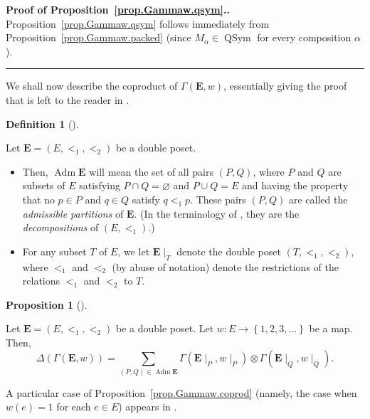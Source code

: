 \documentclass[numbers=enddot,12pt,final,onecolumn,notitlepage,abstracton]{scrartcl}
\theoremstyle{definition}
\newtheorem{prop}[theo]{Proposition}
\newenvironment{proposition}[1][]
{\begin{prop}[#1]\begin{leftbar}}
{\end{leftbar}\end{prop}}
\newtheorem{defi}[theo]{Definition}
\newenvironment{definition}[1][]
{\begin{defi}[#1]\begin{leftbar}}
{\end{leftbar}\end{defi}}
\newenvironment{proof}[1][Proof]{\noindent\textbf{#1.} }{\ \rule{0.5em}{0.5em}}
\let\sumnonlimits\sum
\renewcommand{\sum}{\sumnonlimits\limits}
\newcommand{\Adm}{\operatorname{Adm}}
\newcommand{\QSym}{{\operatorname{QSym}}}
\newcommand{\EE}{{\mathbf{E}}}
\begin{document}
\begin{proof}[Proof of Proposition~\ref{prop.Gammaw.qsym}.]
Proposition~\ref{prop.Gammaw.qsym} follows immediately from
Proposition~\ref{prop.Gammaw.packed}
(since $M_\alpha \in \QSym$ for every composition $\alpha$).
\end{proof}

We shall now describe the coproduct of $\Gamma\left(\EE, w\right)$,
essentially giving the proof that is left to the reader in
\cite[Theorem 2.2]{Mal-Reu-DP}.

\begin{definition}
Let $\EE = \left(E, <_1, <_2\right)$ be a double poset.

\begin{itemize}

\item[(a)]
Then, $\Adm \EE$ will mean the set of all pairs
$\left(P, Q\right)$, where $P$ and $Q$ are subsets of $E$ satisfying
$P \cap Q = \varnothing$ and $P \cup Q = E$ and having the property
that no $p \in P$ and $q \in Q$ satisfy $q <_1 p$. These pairs
$\left(P, Q\right)$ are
called the \textit{admissible partitions} of $\EE$. (In the
terminology of \cite{Mal-Reu-DP}, they are the
\textit{decompositions} of $\left(E, <_1\right)$.)

\item[(b)] For
any subset $T$ of $E$, we let $\EE\mid_T$ denote the double poset
$\left(T, <_1, <_2\right)$, where $<_1$ and $<_2$ (by abuse of
notation) denote the restrictions of the relations $<_1$ and $<_2$
to $T$.

\end{itemize}
\end{definition}

\begin{proposition}
\label{prop.Gammaw.coprod}
Let $\EE = \left(E, <_1, <_2\right)$ be a double poset. Let
$w : E \to \left\{1, 2, 3, \ldots\right\}$ be a map.
Then,
\begin{equation}
\label{eq.prop.Gammaw.coprod}
\Delta\left(\Gamma\left(\EE, w\right)\right)
= \sum_{\left(P, Q\right) \in \Adm \EE}
\Gamma\left(\EE\mid_P, w\mid_P\right)
\otimes \Gamma\left(\EE\mid_Q, w\mid_Q\right) .
\end{equation}
\end{proposition}

A particular case of Proposition~\ref{prop.Gammaw.coprod} (namely,
the case when $w\left(e\right) = 1$ for each $e \in E$) appears in
\cite[Th\'eor\`eme 4.16]{Malve-Thesis}.
\end{document}
